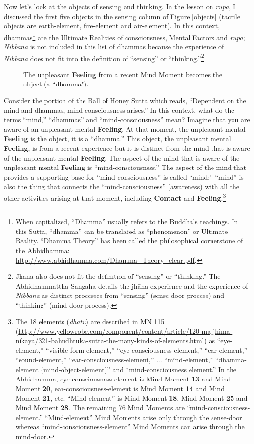 \pagebreak

Now let’s look at the objects of sensing and thinking. In the lesson on \textit{rūpa}, I discussed the first five objects in the sensing column of Figure \ref{objects} (tactile objects are earth-element, fire-element and air-element). In this context, dhammas\footnote{When capitalized, “Dhamma” usually refers to the Buddha’s teachings. In this Sutta, “dhamma” can be translated as “phenomenon” or Ultimate Reality. “Dhamma Theory” has been called the philosophical cornerstone of the Abhidhamma: \url{http://www.abhidhamma.com/Dhamma_Theory_clear.pdf}.} are the Ultimate Realities of consciousness, Mental Factors and \textit{rūpa}; \textit{Nibbāna} is not included in this list of dhammas because the experience of \textit{Nibbāna} does not fit into the definition of “sensing” or “thinking.”\footnote{Jhāna also does not fit the definition of “sensing” or “thinking.” The Abhidhammattha Sangaha details the jhāna experience and the experience of \textit{Nibbāna} as distinct processes from ``sensing” (sense-door process) and “thinking” (mind-door process).}

\begin{figure}[H]
\centering

\caption{The unpleasant \textbf{Feeling} from a recent Mind Moment becomes the object (a ``dhamma").}
\label{fig:Feeling}
\end{figure}

Consider the portion of the Ball of Honey Sutta which reads, “Dependent on the mind and dhammas, mind-consciousness arises.” In this context, what do the terms “mind,” “dhammas” and “mind-consciousness” mean? Imagine that you are aware of an unpleasant mental \textbf{Feeling}. At that moment, the unpleasant mental \textbf{Feeling} is the object, it is a “dhamma.” This object, the unpleasant mental \textbf{Feeling}, is from a recent experience but it is distinct from the mind that is aware of the unpleasant mental \textbf{Feeling}. The aspect of the mind that is aware of the unpleasant mental \textbf{Feeling} is “mind-consciousness.” The aspect of the mind that provides a supporting base for “mind-consciousness” is called “mind;” “mind” is also the thing that connects the “mind-consciousness” (awareness) with all the other activities arising at that moment, including \textbf{Contact} and \textbf{Feeling}.\footnote{The 18 elements (\textit{dhātu}) are described in MN 115 (\url{http://www.yellowrobe.com/component/content/article/120-majjhima-nikaya/321-bahudhtuka-sutta-the-many-kinds-of-elements.html}) as “eye-element,” “visible-form-element,” “eye-consciousness-element,” “ear-element,” “sound-element,” “ear-consciousness-element,” ... “mind-element,” “dhamma-element (mind-object-element)” and “mind-consciousness element.” In the Abhidhamma, eye-consciousness-element is Mind Moment \textbf{13} and Mind Moment \textbf{20}, ear-consciousness-element is Mind Moment \textbf{14} and Mind Moment \textbf{21}, etc. “Mind-element” is Mind Moment \textbf{18}, Mind Moment \textbf{25} and Mind Moment \textbf{28}. The remaining 76 Mind Moments are “mind-consciousness-element.” “Mind-element” Mind Moments arise only through the sense-door whereas “mind-consciousness-element” Mind Moments can arise through the mind-door.}

